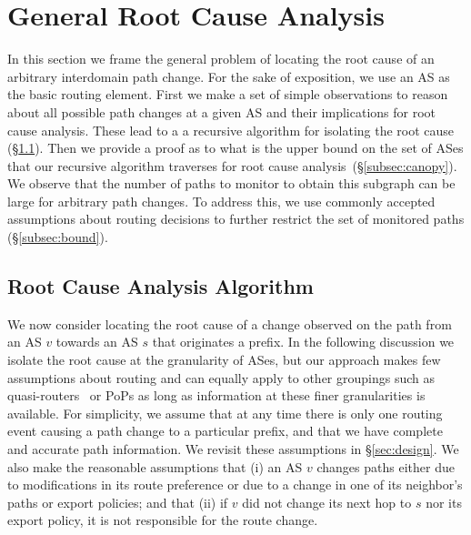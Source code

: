 \section{General Root Cause Analysis}
\label{sec:general}

In this section we frame the general problem of locating the root cause
of an arbitrary interdomain path change. For the sake of exposition, we
use an AS as the basic routing element.
First we make a set of simple observations to 
reason about all possible path changes at a given AS and their implications for root cause analysis. These lead to a a recursive algorithm for isolating the root cause (\S\ref{subsec:rules}).  
Then we provide a proof as to what is the upper bound on
the set of ASes that our recursive algorithm traverses for root cause
analysis~(\S\ref{subsec:canopy}).
We observe that the number of paths to monitor to obtain this subgraph can
be large for arbitrary path changes. To address this, we use commonly
accepted assumptions about routing decisions to further restrict the set
of monitored paths (\S\ref{subsec:bound}). 


\subsection{Root Cause Analysis Algorithm}
\label{subsec:rules}

We now consider locating the root cause of a change observed on the
path from an AS $v$ towards an AS $s$ that originates a prefix.  In the
following  discussion we isolate the root cause at the granularity of
ASes, but our approach makes few assumptions about routing and can
equally apply to other groupings such as
quasi-routers~\cite{muhlbauer:quasi-router} or PoPs as long as information at these
finer granularities is available.
For simplicity, we assume that at any time there is only one routing event causing a
path change to a particular prefix, and that we have complete and accurate path information.
We revisit these assumptions in \S\ref{sec:design}. We also make the
reasonable assumptions that (i) an AS $v$ changes paths either due to
modifications in its route preference or due to a change in one of its
neighbor's paths or export policies; and that (ii) if $v$ did not change
its next hop to $s$ nor its export policy, it is not responsible for the
route change.  

